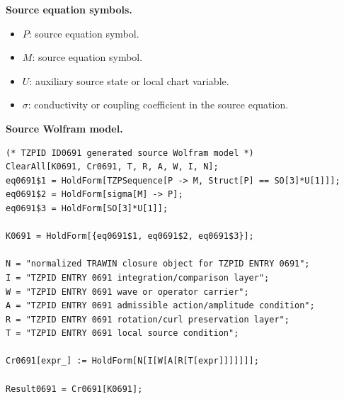\begin{minipage}[t]{0.49\linewidth}
\begingroup
\small
\raggedright
\textbf{Source equation symbols.}\par
\begin{itemize}[leftmargin=1.35em,itemsep=1pt,topsep=1pt,parsep=0pt]
    \item $P$: source equation symbol.
    \item $M$: source equation symbol.
    \item $U$: auxiliary source state or local chart variable.
    \item $\sigma$: conductivity or coupling coefficient in the source equation.
\end{itemize}
\endgroup
\end{minipage}\hfill
\begin{minipage}[t]{0.47\linewidth}
\begingroup
\scriptsize
\raggedright
\textbf{Source Wolfram model.}\par
\begin{Verbatim}[fontsize=\tiny,breaklines=true,breakanywhere=true]
(* TZPID ID0691 generated source Wolfram model *)
ClearAll[K0691, Cr0691, T, R, A, W, I, N];
eq0691$1 = HoldForm[TZPSequence[P -> M, Struct[P] == SO[3]*U[1]]];
eq0691$2 = HoldForm[sigma[M] -> P];
eq0691$3 = HoldForm[SO[3]*U[1]];

K0691 = HoldForm[{eq0691$1, eq0691$2, eq0691$3}];

N = "normalized TRAWIN closure object for TZPID ENTRY 0691";
I = "TZPID ENTRY 0691 integration/comparison layer";
W = "TZPID ENTRY 0691 wave or operator carrier";
A = "TZPID ENTRY 0691 admissible action/amplitude condition";
R = "TZPID ENTRY 0691 rotation/curl preservation layer";
T = "TZPID ENTRY 0691 local source condition";

Cr0691[expr_] := HoldForm[N[I[W[A[R[T[expr]]]]]]];

Result0691 = Cr0691[K0691];
\end{Verbatim}
\endgroup
\end{minipage}


